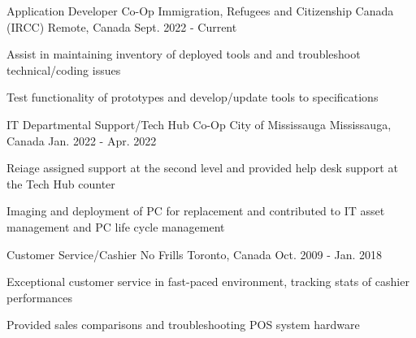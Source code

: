 \begin{cventries}
  \cventry
    {Application Developer Co-Op}
    {Immigration, Refugees and Citizenship Canada (IRCC)}
    {Remote, Canada}
    {Sept. 2022 - Current}
    {
      \begin{cvitems}
        \item {Assist in maintaining inventory of deployed tools and and troubleshoot technical/coding issues}
        \item {Test functionality of prototypes and develop/update tools to specifications}
      \end{cvitems}
    }
      \cventry
    {IT Departmental Support/Tech Hub Co-Op}
    {City of Mississauga}
    {Mississauga, Canada}
    {Jan. 2022 - Apr. 2022}
    {
      \begin{cvitems}
        \item {Reiage assigned support at the second level and provided help desk support at the Tech Hub counter}
        \item {Imaging and deployment of PC for replacement and contributed to IT asset management and PC life cycle management }
      \end{cvitems}
    }
  \cventry
    {Customer Service/Cashier}
    {No Frills}
    {Toronto, Canada}
    {Oct. 2009 - Jan. 2018}
    {
      \begin{cvitems}
        \item {Exceptional customer service in fast-paced environment, tracking stats of cashier performances}
        \item {Provided sales comparisons and troubleshooting POS system hardware}
      \end{cvitems}
    }
\end{cventries}
